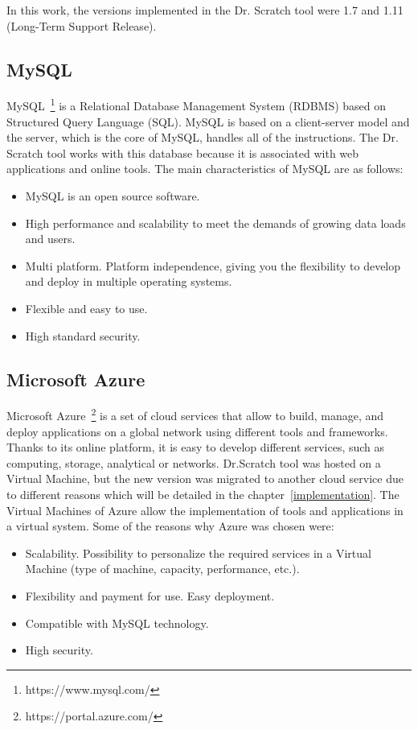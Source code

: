 In this work, the versions implemented in the Dr. Scratch tool were 1.7 and 1.11 (Long-Term Support Release).


\subsection{MySQL}
\label{subsec:mysql}

MySQL~\footnote{https://www.mysql.com/} is a Relational Database Management System (RDBMS) based on Structured Query Language (SQL). MySQL is based on a client-server model and the server, which is the core of MySQL, handles all of the instructions. The Dr. Scratch tool works with this database because it is associated with web applications and online tools. The main characteristics of MySQL are as follows:


\begin{itemize}
  \item MySQL is an open source software.
  \item High performance and scalability to meet the demands of growing data loads and users.
  \item Multi platform. Platform independence, giving you the flexibility to develop and deploy in multiple operating systems.
  \item Flexible and easy to use.
  \item High standard security.
\end{itemize}  

 

\subsection{Microsoft Azure}
\label{subsec:azure}

Microsoft Azure~\footnote{https://portal.azure.com/} is a set of cloud services that allow to build, manage, and deploy applications on a global network using different tools and frameworks. Thanks to its online platform, it is easy to develop different services, such as computing, storage, analytical or networks. Dr.Scratch tool was hosted on a Virtual Machine, but the new version was migrated to another cloud service due to different reasons which will be detailed in the chapter~\ref{implementation}. The Virtual Machines of Azure allow the implementation of tools and applications in a virtual system. Some of the reasons why Azure was chosen were:

\begin{itemize}
    \item Scalability. Possibility to personalize the required services in a Virtual Machine (type of machine, capacity, performance, etc.).
    \item Flexibility and payment for use. Easy deployment.
    \item Compatible with MySQL technology.
    \item High security.
\end{itemize}


